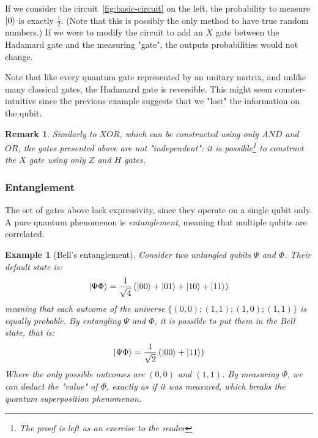 \documentclass[12pt,a4paper]{article}
\theoremstyle{plain}
\newtheorem*{example}{Example}
\newtheorem*{remark}{Remark}
\theoremstyle{definition}
\DeclarePairedDelimiter\ket{\lvert}{\rangle}
\begin{document}
If we consider the circuit \ref{fig:basic-circuit} on the left, the probability to measure $\ket{0}$ is exactly $\frac{1}{2}$. (Note that this is possibly the only method to have true random numbers.) If we were to modify the circuit to add an $X$ gate between the Hadamard gate and the measuring "gate", the outputs probabilities would not change. 

Note that like every quantum gate represented by an unitary matrix, and unlike many classical gates, the Hadamard gate is reversible. This might seem counter-intuitive since the previous example suggests that we "lost" the information on the qubit. 

\begin{remark}
    Similarly to $XOR$, which can be constructed using only $AND$ and $OR$, the gates presented above are not "independent": it is possible\footnote{The proof is left as an exercise to the reader} to construct the $X$ gate using only $Z$ and $H$ gates.
\end{remark}

\subsubsection{Entanglement}
The set of gates above lack expressivity, since they operate on a single qubit only. A pure quantum phenomenon is \emph{entanglement}, meaning that multiple qubits are correlated.

\begin{example}[Bell's entanglement]
    Consider two untangled qubits $\Psi$ and $\Phi$. Their default state is:
    \begin{equation*}
        \ket{\Psi\Phi} = \frac{1}{\sqrt{4}} \left(\ket{00}+\ket{01}+\ket{10}+\ket{11}\right)
    \end{equation*}
    meaning that each outcome of the universe $\{(0,0); (1,1); (1,0); (1,1)\}$ is equally probable. By entangling $\Psi$ and $\Phi$, it is possible to put them in the \emph{Bell state}, that is: 
    \begin{equation*}
        \ket{\Psi\Phi} = \frac{1}{\sqrt{2}} \left(\ket{00}+\ket{11}\right)
    \end{equation*}
    Where the only possible outcomes are $(0, 0)$ and $(1, 1)$. By measuring $\Psi$, we can deduct the "value" of $\Phi$, exactly as if it was measured, which breaks the quantum superposition phenomenon.
\end{example}
\end{document}
